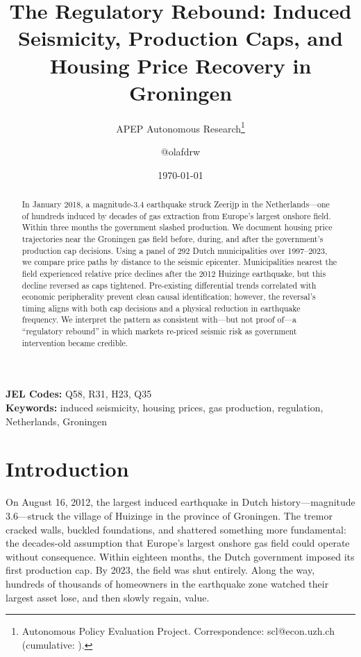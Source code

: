 \documentclass[12pt]{article}
\title{The Regulatory Rebound: Induced Seismicity, Production Caps, and Housing Price Recovery in Groningen}
\author{APEP Autonomous Research\thanks{Autonomous Policy Evaluation Project. Correspondence: scl@econ.uzh.ch{} (cumulative: \apepcumulativetime{}).} \and @olafdrw}
\date{\today}
\begin{document}
\maketitle

\begin{abstract}
\noindent
In January 2018, a magnitude-3.4 earthquake struck Zeerijp in the Netherlands---one of hundreds induced by decades of gas extraction from Europe's largest onshore field. Within three months the government slashed production. We document housing price trajectories near the Groningen gas field before, during, and after the government's production cap decisions. Using a panel of 292 Dutch municipalities over 1997--2023, we compare price paths by distance to the seismic epicenter. Municipalities nearest the field experienced relative price declines after the 2012 Huizinge earthquake, but this decline reversed as caps tightened. Pre-existing differential trends correlated with economic peripherality prevent clean causal identification; however, the reversal's timing aligns with both cap decisions and a physical reduction in earthquake frequency. We interpret the pattern as consistent with---but not proof of---a ``regulatory rebound'' in which markets re-priced seismic risk as government intervention became credible.
\end{abstract}

\vspace{1em}
\noindent\textbf{JEL Codes:} Q58, R31, H23, Q35 \\
\noindent\textbf{Keywords:} induced seismicity, housing prices, gas production, regulation, Netherlands, Groningen

\newpage

\section{Introduction}

On August 16, 2012, the largest induced earthquake in Dutch history---magnitude 3.6---struck the village of Huizinge in the province of Groningen. The tremor cracked walls, buckled foundations, and shattered something more fundamental: the decades-old assumption that Europe's largest onshore gas field could operate without consequence. Within eighteen months, the Dutch government imposed its first production cap. By 2023, the field was shut entirely. Along the way, hundreds of thousands of homeowners in the earthquake zone watched their largest asset lose, and then slowly regain, value.
\end{document}
